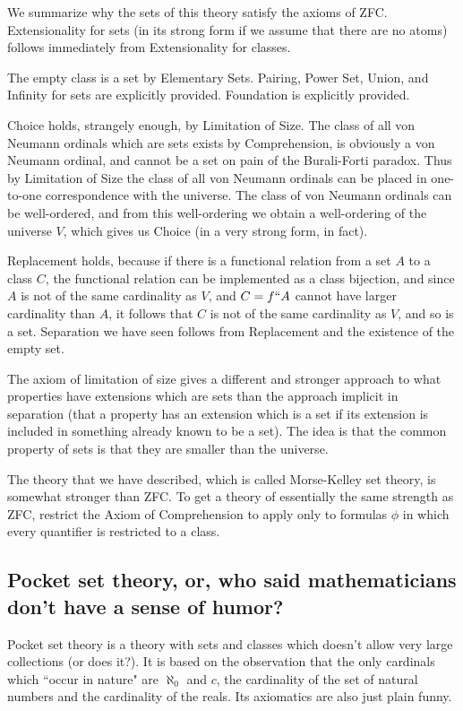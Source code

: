 \documentclass[12pt]{book}
\begin{document}
We summarize why the sets of this theory satisfy the axioms of ZFC.  Extensionality for sets  (in its strong form if we assume that there are no atoms) follows immediately from Extensionality for classes.

The empty class is a set by Elementary Sets.  Pairing, Power Set, Union, and Infinity for sets are explicitly provided.  Foundation is explicitly provided.

Choice holds, strangely enough, by Limitation of Size.  The class of all von Neumann ordinals which are sets exists by Comprehension, is obviously a von Neumann ordinal, and cannot be a set on pain of the Burali-Forti paradox.  Thus by Limitation of Size the class of all von Neumann ordinals can be placed in one-to-one correspondence with the universe.  The class of von Neumann ordinals can be well-ordered, and from this well-ordering we obtain a well-ordering of the universe $V$, which gives us Choice (in a very strong form, in fact).

Replacement holds, because if there is a functional relation from a set $A$ to a class $C$, the functional relation can be implemented as a class bijection,
and since $A$ is not of the same cardinality as $V$, and $C=f``A$ cannot have larger cardinality than $A$, it follows that $C$ is not of the same cardinality
as $V$, and so is a set.  Separation we have seen follows from Replacement and the existence of the empty set.

The axiom of limitation of size gives a different and stronger approach to what properties have extensions which are sets than the approach implicit in separation (that a property has an extension which is a set if its extension is included in something already known to be a set).  The idea is that the common property of sets is that they are smaller than the universe.

The theory that we have described, which is called Morse-Kelley set theory, is somewhat stronger than ZFC.  To get a theory of essentially the same strength as ZFC, restrict the Axiom of Comprehension to apply only to formulas $\phi$ in which every quantifier is restricted to a class.

\subsection{Pocket set theory, or, who said mathematicians don't have a sense of humor?}

Pocket set theory is a theory with sets and classes which doesn't allow very large collections (or does it?).  It is based on the observation that
the only cardinals which ``occur in nature" are $\aleph_0$ and $c$, the cardinality of the set of natural numbers and the cardinality of the reals.
Its axiomatics are also just plain funny.
\end{document}
